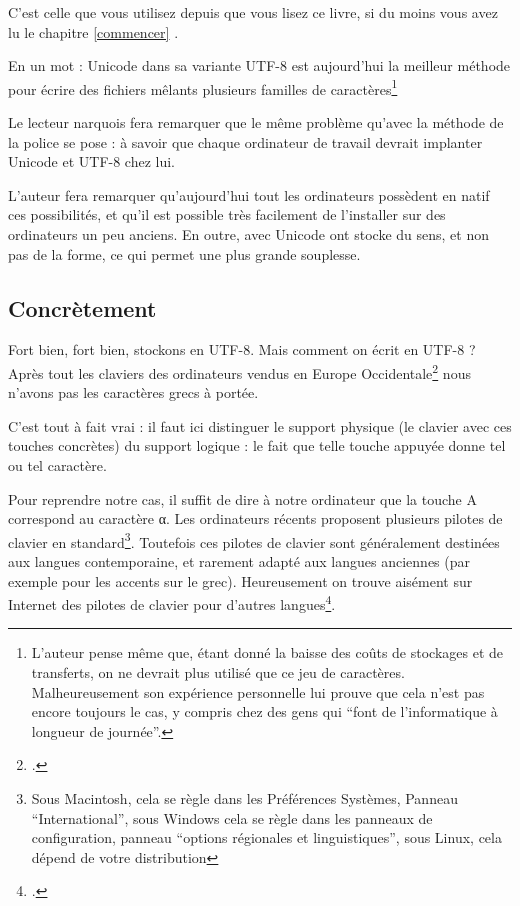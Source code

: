C'est celle que vous utilisez depuis que vous lisez ce livre, si du moins vous avez lu le chapitre \ref{commencer} .

En un mot : Unicode dans sa variante UTF-8 est aujourd'hui la meilleur méthode pour écrire des fichiers mêlants plusieurs familles de caractères\footnote{L'auteur pense même que, étant donné la baisse des coûts de stockages et de transferts, on ne devrait plus utilisé que ce jeu de caractères. Malheureusement son expérience personnelle lui prouve que cela n'est pas encore toujours le cas, y compris chez des gens qui \enquote{font de l'informatique à longueur de journée}.}

\begin{anedocte}Le lecteur narquois fera remarquer que le même problème qu'avec la méthode de la police se pose : à savoir que chaque ordinateur de travail devrait implanter Unicode et UTF-8 chez lui. 

L'auteur fera remarquer qu'aujourd'hui tout les ordinateurs possèdent en natif ces possibilités, et qu'il est possible très facilement de l'installer sur des ordinateurs un peu anciens. En outre, avec Unicode ont stocke du sens, et non pas de la forme, ce qui permet une plus grande souplesse. 

\end{anedocte}

\subsection{Concrètement}

Fort bien, fort bien, stockons en UTF-8. Mais comment on écrit en UTF-8 ? Après tout les claviers des ordinateurs vendus en Europe Occidentale\footcite{Le lecteur militant voudra bien pardonner cet ethnocentrisme.} nous n'avons pas les caractères grecs à portée.

C'est tout à fait vrai : il faut ici distinguer le support physique (le clavier avec ces touches concrètes) du support logique : le fait que telle touche appuyée donne tel ou tel caractère. 

Pour reprendre notre cas, il suffit de dire à notre ordinateur que la touche A correspond au caractère α. Les ordinateurs récents proposent plusieurs pilotes de clavier en standard\footnote{Sous Macintosh, cela se règle dans les Préférences Systèmes, Panneau \enquote{International}, sous Windows cela se règle dans les panneaux de configuration, panneau \enquote{options régionales et linguistiques}, sous Linux, cela dépend de votre distribution}. Toutefois ces pilotes de clavier sont généralement destinées aux langues contemporaine, et rarement adapté aux langues anciennes (par exemple pour les accents sur le grec). Heureusement on trouve aisément sur Internet des pilotes de clavier pour d'autres langues\footcite[Pour ce qui concerne le grec ancien, le syriaque, l'hébreu ancien, on pourra utiliser les claviers proposés par Michel Langlois][]{clavierLanglois}.


